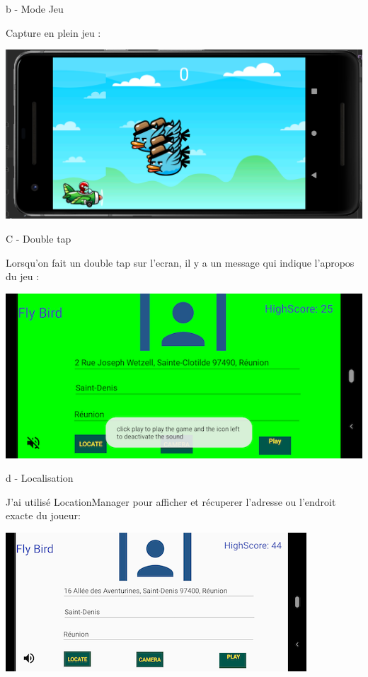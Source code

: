 \documentclass{rapportECL}
\begin{document}
b - Mode Jeu

Capture en plein jeu : 

\begin{center}
    \includegraphics[scale = 0.5]{logos/ModeGame.png}
\end{center}

C - Double tap

Lorsqu'on fait un double tap sur l'ecran, il y a un message qui indique l'apropos du jeu : 

\begin{center}
    \includegraphics[scale = 0.5]{logos/doubletap.png}
\end{center}

d - Localisation

J'ai utilisé LocationManager pour afficher et récuperer l'adresse ou l'endroit exacte du joueur: 

\begin{center}
    \includegraphics[scale = 0.5]{logos/geolocalisation.png}
\end{center}
\end{document}
